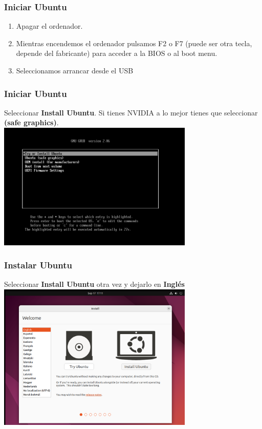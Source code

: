 \documentclass[10pt]{beamer}
\begin{document}
	\begin{frame}
		\frametitle{Iniciar Ubuntu}
		\begin{enumerate}
			\item Apagar el ordenador.
			\item Mientras encendemos el ordenador pulsamos F2 o F7 (puede ser otra tecla, depende del fabricante) para acceder a la BIOS o al boot menu.
			\item Seleccionamos arrancar desde el USB
		\end{enumerate}
	\end{frame}
	
	\begin{frame}
		\frametitle{Iniciar Ubuntu}
		Seleccionar \textbf{Install Ubuntu}. Si tienes NVIDIA a lo mejor tienes que seleccionar \textbf{(safe graphics)}.\\
		
		\includegraphics[width=0.7\textwidth]{install}
	\end{frame}
	
	\begin{frame}
		\frametitle{Instalar Ubuntu}
		Seleccionar \textbf{Install Ubuntu} otra vez y dejarlo en \textbf{Inglés}\\
		
		\includegraphics[width=0.7\textwidth]{install2}
	\end{frame}
	
\end{document}

